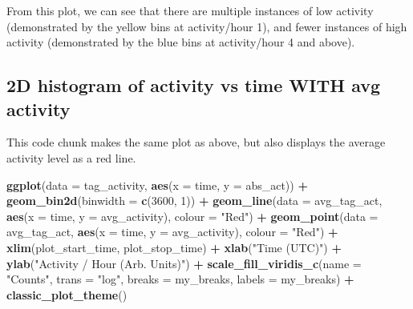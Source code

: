 \documentclass[
]{book}
\newenvironment{Shaded}{\begin{snugshade}}{\end{snugshade}}
\newcommand{\AttributeTok}[1]{\textcolor[rgb]{0.13,0.29,0.53}{#1}}
\newcommand{\DecValTok}[1]{\textcolor[rgb]{0.00,0.00,0.81}{#1}}
\newcommand{\FunctionTok}[1]{\textcolor[rgb]{0.13,0.29,0.53}{\textbf{#1}}}
\newcommand{\NormalTok}[1]{#1}
\newcommand{\SpecialCharTok}[1]{\textcolor[rgb]{0.81,0.36,0.00}{\textbf{#1}}}
\newcommand{\StringTok}[1]{\textcolor[rgb]{0.31,0.60,0.02}{#1}}
\begin{document}
From this plot, we can see that there are multiple instances of low activity (demonstrated by the yellow bins at activity/hour 1), and fewer instances of high activity (demonstrated by the blue bins at activity/hour 4 and above).

\subsection{2D histogram of activity vs time WITH avg activity}\label{d-histogram-of-activity-vs-time-with-avg-activity}

This code chunk makes the same plot as above, but also displays the average activity level as a red line.

\begin{Shaded}
\begin{Highlighting}[]
\FunctionTok{ggplot}\NormalTok{(}\AttributeTok{data =}\NormalTok{ tag\_activity, }
       \FunctionTok{aes}\NormalTok{(}\AttributeTok{x =}\NormalTok{ time, }
           \AttributeTok{y =}\NormalTok{ abs\_act)) }\SpecialCharTok{+}
 \FunctionTok{geom\_bin2d}\NormalTok{(}\AttributeTok{binwidth =} \FunctionTok{c}\NormalTok{(}\DecValTok{3600}\NormalTok{, }\DecValTok{1}\NormalTok{)) }\SpecialCharTok{+}
  \FunctionTok{geom\_line}\NormalTok{(}\AttributeTok{data =}\NormalTok{ avg\_tag\_act, }
            \FunctionTok{aes}\NormalTok{(}\AttributeTok{x =}\NormalTok{ time, }
                \AttributeTok{y =}\NormalTok{ avg\_activity),}
            \AttributeTok{colour =} \StringTok{"Red"}\NormalTok{) }\SpecialCharTok{+}
  \FunctionTok{geom\_point}\NormalTok{(}\AttributeTok{data =}\NormalTok{ avg\_tag\_act, }
             \FunctionTok{aes}\NormalTok{(}\AttributeTok{x =}\NormalTok{ time, }
                 \AttributeTok{y =}\NormalTok{ avg\_activity), }
             \AttributeTok{colour =} \StringTok{"Red"}\NormalTok{) }\SpecialCharTok{+}
  \FunctionTok{xlim}\NormalTok{(plot\_start\_time, }
\NormalTok{       plot\_stop\_time) }\SpecialCharTok{+}
  \FunctionTok{xlab}\NormalTok{(}\StringTok{"Time (UTC)"}\NormalTok{) }\SpecialCharTok{+}
  \FunctionTok{ylab}\NormalTok{(}\StringTok{"Activity / Hour (Arb. Units)"}\NormalTok{) }\SpecialCharTok{+}
  \FunctionTok{scale\_fill\_viridis\_c}\NormalTok{(}\AttributeTok{name =} \StringTok{"Counts"}\NormalTok{, }
                       \AttributeTok{trans =} \StringTok{"log"}\NormalTok{, }
                       \AttributeTok{breaks =}\NormalTok{ my\_breaks, }
                       \AttributeTok{labels =}\NormalTok{ my\_breaks) }\SpecialCharTok{+}
  \FunctionTok{classic\_plot\_theme}\NormalTok{()}
\end{Highlighting}
\end{Shaded}
\end{document}
